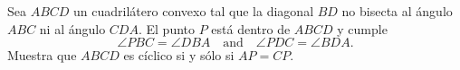 Sea $ABCD$ un cuadrilátero convexo tal que la diagonal $BD$ no bisecta al ángulo $ABC$ ni al ángulo $CDA$. El punto $P$ está dentro de $ABCD$ y cumple
 \[\angle PBC=\angle DBA\quad\text{and}\quad \angle PDC=\angle BDA.\]
Muestra que $ABCD$ es cíclico si y sólo si $AP=CP$.